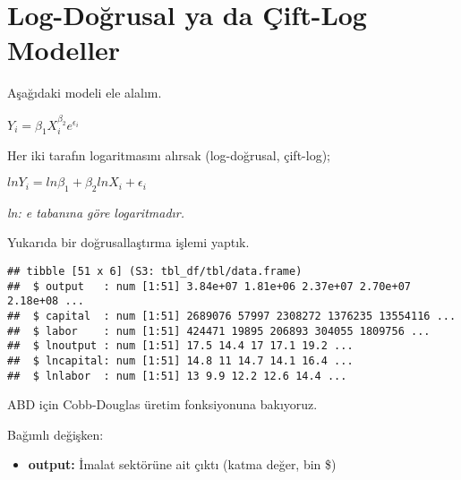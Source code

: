 \documentclass[
]{book}
\newenvironment{Shaded}{\begin{snugshade}}{\end{snugshade}}
\newcommand{\CommentTok}[1]{\textcolor[rgb]{0.56,0.35,0.01}{\textit{#1}}}
\newcommand{\DataTypeTok}[1]{\textcolor[rgb]{0.13,0.29,0.53}{#1}}
\newcommand{\KeywordTok}[1]{\textcolor[rgb]{0.13,0.29,0.53}{\textbf{#1}}}
\newcommand{\NormalTok}[1]{#1}
\newcommand{\OperatorTok}[1]{\textcolor[rgb]{0.81,0.36,0.00}{\textbf{#1}}}
\newcommand{\StringTok}[1]{\textcolor[rgb]{0.31,0.60,0.02}{#1}}
\providecommand{\tightlist}{%
  \setlength{\itemsep}{0pt}\setlength{\parskip}{0pt}}
\begin{document}
\hypertarget{log-doux11frusal-ya-da-uxe7ift-log-modeller}{%
\section{Log-Doğrusal ya da Çift-Log Modeller}\label{log-doux11frusal-ya-da-uxe7ift-log-modeller}}

Aşağıdaki modeli ele alalım.

\(Y_i = \beta_1X_i^{\beta_2}e^{\epsilon_i}\)

Her iki tarafın logaritmasını alırsak (log-doğrusal, çift-log);

\(lnY_i = ln\beta_1 + \beta_2lnX_i + \epsilon_i\)

\emph{ln: e tabanına göre logaritmadır.}

Yukarıda bir doğrusallaştırma işlemi yaptık.

\begin{Shaded}
\end{Shaded}

\begin{verbatim}
## tibble [51 x 6] (S3: tbl_df/tbl/data.frame)
##  $ output   : num [1:51] 3.84e+07 1.81e+06 2.37e+07 2.70e+07 2.18e+08 ...
##  $ capital  : num [1:51] 2689076 57997 2308272 1376235 13554116 ...
##  $ labor    : num [1:51] 424471 19895 206893 304055 1809756 ...
##  $ lnoutput : num [1:51] 17.5 14.4 17 17.1 19.2 ...
##  $ lncapital: num [1:51] 14.8 11 14.7 14.1 16.4 ...
##  $ lnlabor  : num [1:51] 13 9.9 12.2 12.6 14.4 ...
\end{verbatim}

ABD için Cobb-Douglas üretim fonksiyonuna bakıyoruz.

Bağımlı değişken:

\begin{itemize}
\tightlist
\item
  \textbf{output:} İmalat sektörüne ait çıktı (katma değer, bin \$)
\end{itemize}
\end{document}

